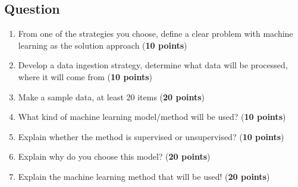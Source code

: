 \documentclass[12pt,titlepage]{article}
\begin{document}
\subsection*{Question}
\begin{enumerate}
    \item From one of the strategies you choose, define a clear problem with machine learning as the solution approach (\textbf{10 points})
    \item Develop a data ingestion strategy, determine what data will be processed, where it will come from (\textbf{10 points})
    \item Make a sample data, at least 20 items (\textbf{20 points})
    \item What kind of machine learning model/method will be used? (\textbf{10 points})
    \item Explain whether the method is supervised or unsupervised? (\textbf{10 points})
    \item Explain why do you choose this model? (\textbf{20 points})
    \item Explain the machine learning method that will be used! (\textbf{20 points})
\end{enumerate}
\end{document}
